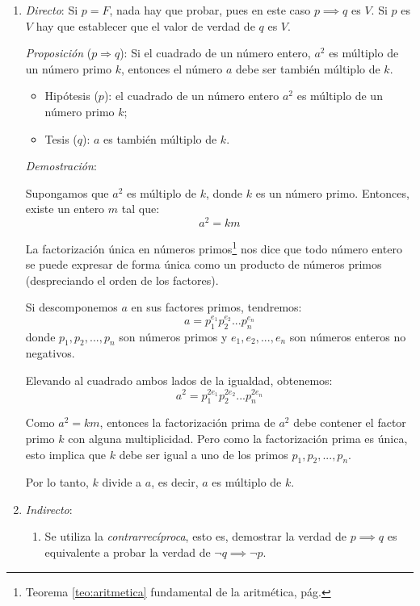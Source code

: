 \begin{enumerate}[label=\roman*)]
	\item \textit{Directo}: Si $p = F$, nada hay que probar, pues en este caso $p \implies q$ es $V$. Si $p$ es $V$ hay que establecer que el valor de verdad de $q$ es $V$.
	
	\begin{fmd-example} \label{ex:directo}
		\textit{Proposición} ($p \Rightarrow q$): Si el cuadrado de un número entero, $a^2$ es múltiplo de un número primo $k$, entonces el número $a$ debe ser también múltiplo de $k$.
		
		\begin{itemize}
			\item Hipótesis ($p$): el cuadrado de un número entero $a^2$ es múltiplo de un número primo $k$;
			\item Tesis ($q$): $a$ es también múltiplo de $k$.
		\end{itemize}
		
		\textit{Demostración}:
		
		Supongamos que $a^2$ es múltiplo de $k$, donde $k$ es un número primo. Entonces, existe un entero $m$ tal que:
		$$a^2 = km$$
		
		La factorización única en números primos\footnote{Teorema \ref{teo:aritmetica} fundamental de la aritmética, pág. \pageref{teo:aritmetica}} nos dice que todo número entero se puede expresar de forma única como un producto de números primos (despreciando el orden de los factores). 
		
		Si descomponemos $a$ en sus factores primos, tendremos:
		$$a = p_1^{e_1}p_2^{e_2}...p_n^{e_n}$$
		donde $p_1, p_2, ..., p_n$ son números primos y $e_1, e_2, ..., e_n$ son números enteros no negativos.
		
		Elevando al cuadrado ambos lados de la igualdad, obtenemos:
		$$a^2 = p_1^{2e_1}p_2^{2e_2}...p_n^{2e_n}$$
		
		Como $a^2 = km$, entonces la factorización prima de $a^2$ debe contener el factor primo $k$ con alguna multiplicidad. Pero como la factorización prima es única, esto implica que $k$ debe ser igual a uno de los primos $p_1, p_2, ..., p_n$.
		
		Por lo tanto, $k$ divide a $a$, es decir, $a$ es múltiplo de $k$.
	\end{fmd-example}
	
	
	
	\item \textit{Indirecto}:
	\begin{enumerate}[label=\alph*)]
		\item Se utiliza la \textit{contrarrecíproca}, esto es, demostrar la verdad de $p \implies q$ es equivalente a probar la verdad de $\neg q \implies \neg p$.
		

\end{enumerate}
\end{enumerate}
